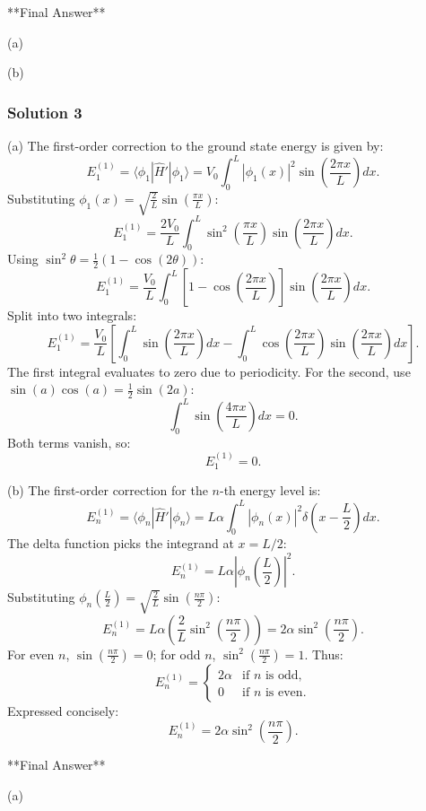 \documentclass{article}
\begin{document}
**Final Answer**

(a) 

(b) 

\subsubsection{Solution 3}
(a) The first-order correction to the ground state energy is given by:
\[
E_1^{(1)} = \langle \phi_1 | \hat{H}' | \phi_1 \rangle = V_0 \int_0^L \left| \phi_1(x) \right|^2 \sin\left(\frac{2\pi x}{L}\right) dx.
\]
Substituting \(\phi_1(x) = \sqrt{\frac{2}{L}} \sin\left(\frac{\pi x}{L}\right)\):
\[
E_1^{(1)} = \frac{2V_0}{L} \int_0^L \sin^2\left(\frac{\pi x}{L}\right) \sin\left(\frac{2\pi x}{L}\right) dx.
\]
Using \(\sin^2\theta = \frac{1}{2}(1 - \cos(2\theta))\):
\[
E_1^{(1)} = \frac{V_0}{L} \int_0^L \left[1 - \cos\left(\frac{2\pi x}{L}\right)\right] \sin\left(\frac{2\pi x}{L}\right) dx.
\]
Split into two integrals:
\[
E_1^{(1)} = \frac{V_0}{L} \left[ \int_0^L \sin\left(\frac{2\pi x}{L}\right) dx - \int_0^L \cos\left(\frac{2\pi x}{L}\right)\sin\left(\frac{2\pi x}{L}\right) dx \right].
\]
The first integral evaluates to zero due to periodicity. For the second, use \(\sin(a)\cos(a) = \frac{1}{2}\sin(2a)\):
\[
\int_0^L \sin\left(\frac{4\pi x}{L}\right) dx = 0.
\]
Both terms vanish, so:
\[
E_1^{(1)} = 0.
\]

(b) The first-order correction for the \(n\)-th energy level is:
\[
E_n^{(1)} = \langle \phi_n | \hat{H}' | \phi_n \rangle = L\alpha \int_0^L \left| \phi_n(x) \right|^2 \delta\left(x - \frac{L}{2}\right) dx.
\]
The delta function picks the integrand at \(x = L/2\):
\[
E_n^{(1)} = L\alpha \left| \phi_n\left(\frac{L}{2}\right) \right|^2.
\]
Substituting \(\phi_n\left(\frac{L}{2}\right) = \sqrt{\frac{2}{L}} \sin\left(\frac{n\pi}{2}\right)\):
\[
E_n^{(1)} = L\alpha \left( \frac{2}{L} \sin^2\left(\frac{n\pi}{2}\right) \right) = 2\alpha \sin^2\left(\frac{n\pi}{2}\right).
\]
For even \(n\), \(\sin\left(\frac{n\pi}{2}\right) = 0\); for odd \(n\), \(\sin^2\left(\frac{n\pi}{2}\right) = 1\). Thus:
\[
E_n^{(1)} = 
\begin{cases} 
2\alpha & \text{if } n \text{ is odd}, \\
0 & \text{if } n \text{ is even}.
\end{cases}
\]
Expressed concisely:
\[
E_n^{(1)} = 2\alpha \sin^2\left(\frac{n\pi}{2}\right).
\]

**Final Answer**

(a) 
\end{document}
